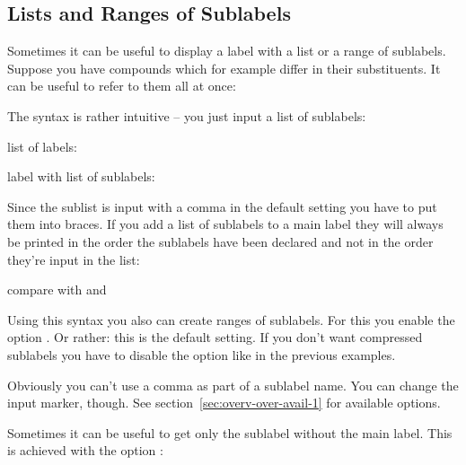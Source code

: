 \documentclass[load-preamble+,ngerman,british,american]{cnltx-doc}
\begin{document}
\subsection{Lists and Ranges of Sublabels}\label{sec:lists-rang-subl}
Sometimes it can be useful to display a label with a list or a range of
sublabels.  Suppose you have compounds
 which for example differ in their
substituents.  It can be useful to refer to them all at once:

The syntax is rather intuitive -- you just input a list of sublabels:
\begin{example}
  list of labels: \par
  label with list of sublabels: 
\end{example}
Since the sublist is input with a comma in the default setting you have to
put them into braces.  If you add a list of sublabels to a main label they
will always be printed in the order the sublabels have been declared and not
in the order they're input in the list:

\begin{example}
  compare 
  with  and
\end{example}

Using this syntax you also can create ranges of sublabels.  For this you
enable the option .  Or rather: this is the default setting.
If you don't want compressed sublabels you have to disable the option like in
the previous examples.
\begin{example}
   \par
   \par
\end{example}

Obviously you can't use a comma as part of a sublabel name.  You can change
the input marker, though.  See section~\ref{sec:overv-over-avail-1} for
available options.

Sometimes it can be useful to get only the sublabel without the main label.
This is achieved with the option :
\end{document}
